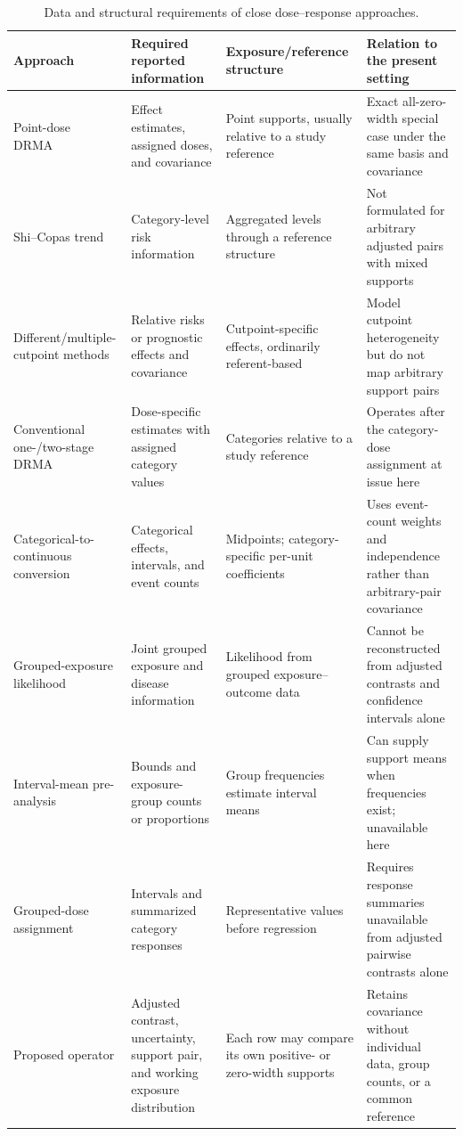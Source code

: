 \documentclass[11pt]{article}
\begin{document}
\begin{table}[htbp]
\centering
\caption{Data and structural requirements of close dose--response approaches.}
\label{tab:supp_method_comparison}
\scriptsize
\setlength{\tabcolsep}{3pt}
\begin{tabular}{p{}p{}p{}p{}}
\toprule
Approach & Required reported information & Exposure/reference structure & Relation to the present setting \\
\midrule
Point-dose DRMA~\cite{Greenland1992,Orsini2012} & Effect estimates, assigned doses, and covariance & Point supports, usually relative to a study reference & Exact all-zero-width special case under the same basis and covariance \\
Shi--Copas trend~\cite{ShiCopas2004} & Category-level risk information & Aggregated levels through a reference structure & Not formulated for arbitrary adjusted pairs with mixed supports \\
Different/multiple-cutpoint methods~\cite{Hartemink2006,Riley2015} & Relative risks or prognostic effects and covariance & Cutpoint-specific effects, ordinarily referent-based & Model cutpoint heterogeneity but do not map arbitrary support pairs \\
Conventional one-/two-stage DRMA~\cite{Yu2013} & Dose-specific estimates with assigned category values & Categories relative to a study reference & Operates after the category-dose assignment at issue here \\
Categorical-to-continuous conversion~\cite{Bauleo2026} & Categorical effects, intervals, and event counts & Midpoints; category-specific per-unit coefficients & Uses event-count weights and independence rather than arbitrary-pair covariance \\
Grouped-exposure likelihood~\cite{Cook2001} & Joint grouped exposure and disease information & Likelihood from grouped exposure--outcome data & Cannot be reconstructed from adjusted contrasts and confidence intervals alone \\
Interval-mean pre-analysis~\cite{Allen2020,Allen2020b} & Bounds and exposure-group counts or proportions & Group frequencies estimate interval means & Can supply support means when frequencies exist; unavailable here \\
Grouped-dose assignment~\cite{Takahashi2010} & Intervals and summarized category responses & Representative values before regression & Requires response summaries unavailable from adjusted pairwise contrasts alone \\
Proposed operator & Adjusted contrast, uncertainty, support pair, and working exposure distribution & Each row may compare its own positive- or zero-width supports & Retains covariance without individual data, group counts, or a common reference \\
\bottomrule
\end{tabular}
\end{table}
\end{document}
